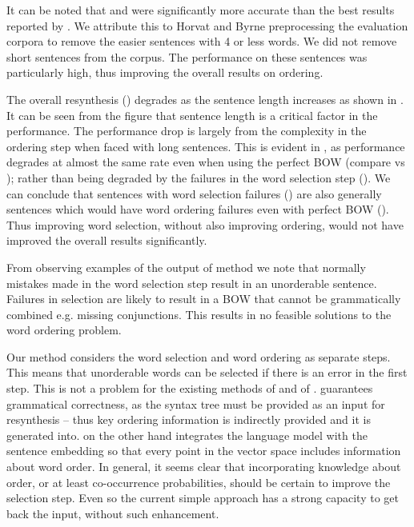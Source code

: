 {It can be noted that \oracletitle{} and \twosteptitle{} were significantly more accurate than the best results reported by \textcite{Horvat2014}. We attribute this to Horvat and Byrne preprocessing the evaluation corpora to remove the easier sentences with 4 or less words. We did not remove short sentences from the corpus. The performance on these sentences was particularly high, thus improving the overall results on ordering.



The overall resynthesis (\twosteptitle{}) degrades as the sentence length increases as shown in . It can be seen from the figure that sentence length is a critical factor in the performance. The performance drop is largely from the complexity in the ordering step when faced with long sentences. This is evident in , as performance degrades at almost the same rate even when using the perfect BOW (compare \oracletitle{} vs \twosteptitle{}); rather than being degraded by the failures in the word selection step (\selectiontitle{}). We can conclude that sentences with word selection failures (\selectiontitle{}) are also generally sentences which would have word ordering failures even with perfect BOW (\oracletitle{}). Thus improving word selection, without also improving ordering, would not have improved the overall results significantly.

From observing examples of the output of method we note that normally mistakes made in the word selection step result in an unorderable sentence. Failures in selection are likely to result in a BOW that cannot be grammatically combined e.g. missing conjunctions. This results in no feasible solutions to the word ordering problem.


Our method considers the word selection and word ordering as separate steps. This means that unorderable words can be selected if there is an error in the first step. This is not a problem for the existing methods of \textcite{iyyer2014generating} and of \textcite{Bowman2015SmoothGeneration}. \textcite{iyyer2014generating} guarantees grammatical correctness, as the syntax tree must be provided as an input for resynthesis -- thus key ordering information is indirectly provided and it is generated into. \textcite{Bowman2015SmoothGeneration} on the other hand integrates the language model with the sentence embedding so that every point in the vector space includes information about word order. In general, it seems clear that incorporating knowledge about order, or at least co-occurrence probabilities, should be certain to improve the selection step. Even so the current simple approach has a strong capacity to get back the input, without such enhancement.


}
